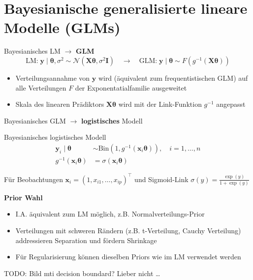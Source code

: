 \documentclass[
  ignorenonframetext,
  aspectratio=169,
]{beamer}
\providecommand{\tightlist}{%
  \setlength{\itemsep}{0pt}\setlength{\parskip}{0pt}}
\newcommand{\bx}{\bm{x}}
\newcommand{\by}{\bm{y}}
\newcommand{\bI}{\bm{I}}
\newcommand{\bX}{\bm{X}}
\newcommand{\Ncal}{\mathcal{N}}
\newcommand{\ssd}{\sigma^2}
\newcommand{\btheta}{\bm{\theta}}
\begin{document}
\section{\texorpdfstring{Bayesianische \textbf{generalisierte} lineare
Modelle
(GLMs)}{Bayesianische generalisierte lineare Modelle (GLMs)}}\label{bayesianische-generalisierte-lineare-modelle-glms}

\begin{frame}{Bayesianisches LM \(\to\) \textbf{GLM}}
\protect{}\label{bayesianisches-lm-to-glm}
\[
\text{LM:} \; \by \mid \btheta, \ssd \sim \Ncal(\bX \btheta, \ssd \bI) \quad
\to \quad \text{GLM:} \; \by \mid \btheta \sim F(g^{-1}(\bX \btheta))
\]

\begin{itemize}
\tightlist
\item
  Verteilungsannahme von \(\by\) wird (äquivalent zum frequentistischen
  GLM) auf alle Verteilungen \(F\) der Exponentatialfamilie ausgeweitet
\item
  Skala des linearen Prädiktors \(\bX \btheta\) wird mit der
  Link-Funktion \(g^{-1}\) angepasst
\end{itemize}
\end{frame}

\begin{frame}{Bayesianisches GLM \(\to\) \textbf{logistisches} Modell}
\protect{}\label{bayesianisches-glm-to-logistisches-modell}
\begin{block}{Bayesianisches logistisches Modell}
\protect{}\label{bayesianisches-logistisches-modell}
\[
\begin{aligned}
  \by_i \mid \btheta &\sim \text{Bin}(1, g^{-1}(\bx_i \btheta)), \quad i = 1, \dots, n \\
  g^{-1}(\bx_i \btheta) &= \sigma(\bx_i \btheta)
\end{aligned}
\]

Für Beobachtungen \(\bx_i = (1, x_{i1}, \dots, x_{ip})^\top\) und
Sigmoid-Link \(\sigma(y) = \frac{\exp(y)}{1 + \exp(y)}\)
\end{block}

\textbf{Prior Wahl}

\begin{itemize}
\tightlist
\item
  I.A. äquivalent zum LM möglich, z.B. Normalverteilungs-Prior
\item
  Verteilungen mit schweren Rändern (z.B. t-Verteilung, Cauchy
  Verteilung) addressieren Separation und fördern Shrinkage
  \autocite{gelman_weakly_2008,ghosh_use_2017}
\item
  Für Regularisierung können dieselben Priors wie im LM verwendet werden
  \autocite{ohara_review_2009,fahrmeir_bayesian_2010,van_erp_shrinkage_2019}
\end{itemize}

TODO: Bild mti decision boundard? Lieber nicht \ldots{}
\end{frame}
\end{document}
